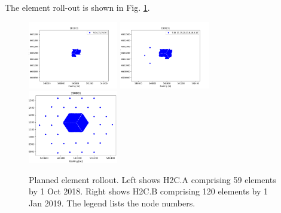 \documentclass{article}
\begin{document}
The element roll-out is shown in Fig. \ref{Fig:rollout}.

\begin{figure}[H]
\includegraphics[width=0.35\textwidth]{cfg181001.png}
\includegraphics[width=0.35\textwidth]{cfg190101.png}
\includegraphics[width=0.35\textwidth]{ant_all.png}
\caption{Planned element rollout.  Left shows H2C.A comprising 59 elements by 1 Oct 2018.  Right shows H2C.B comprising 120 elements by 1 Jan 2019.  The legend lists the node numbers.}
\label{Fig:rollout}
\end{figure}
\end{document}
